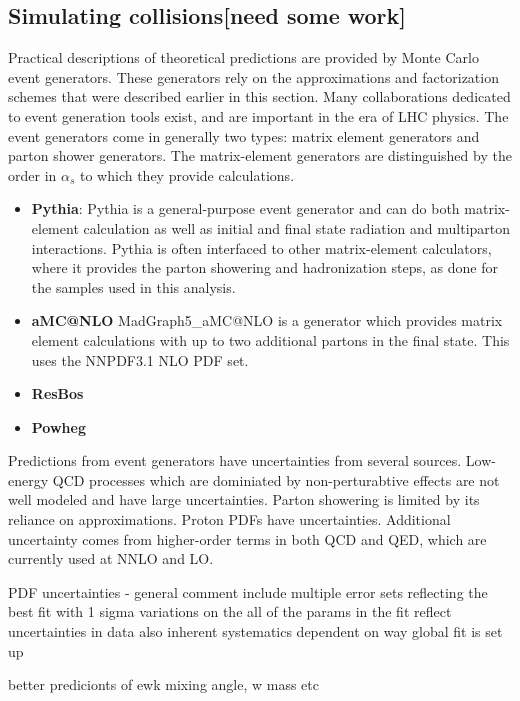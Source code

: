 \subsection{Simulating \pp collisions[need some work]}
Practical descriptions of theoretical predictions are provided by Monte Carlo event generators. These generators rely on the approximations and factorization schemes that were described earlier in this section. Many collaborations dedicated to event generation tools exist, and are important in the era of LHC physics. The event generators come in generally two types: matrix element generators and parton shower generators. The matrix-element generators are distinguished by the order in $\alpha_s$ to which they provide calculations. 
\begin{itemize}
    \item \textbf{Pythia}: Pythia is a general-purpose event generator and can do both matrix-element calculation as well as initial and final state radiation and multiparton interactions. Pythia is often interfaced to other matrix-element calculators, where it provides the parton showering and hadronization steps, as done for the samples used in this analysis. \cite{Sjostrand:2014zea}
    \item \textbf{aMC@NLO} MadGraph5\_aMC@NLO is a generator which provides matrix element calculations with up to two additional partons in the final state. This uses the NNPDF3.1 NLO PDF set.
    \item \textbf{ResBos} 
    \item \textbf{Powheg}
\end{itemize}


Predictions from event generators have uncertainties from several sources. Low-energy QCD processes which are dominiated by non-perturabtive effects are not well modeled and have large uncertainties. Parton showering is limited by its reliance on approximations. Proton PDFs have uncertainties. Additional uncertainty comes from higher-order terms in both QCD and QED, which are currently used at NNLO and LO. 

PDF  uncertainties - general comment
include multiple error sets reflecting the best fit with 1 sigma variations on the all of the params in the fit
reflect uncertainties in data also
inherent systematics dependent on way global fit is set up


better predicionts of ewk mixing angle, w mass etc
